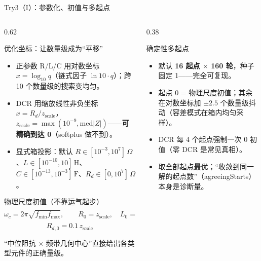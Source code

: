 \documentclass[UTF8,aspectratio=169,10pt]{ctexbeamer}
\begin{document}
\begin{frame}{Try3（I）：参数化、初值与多起点}
  \begin{columns}
    \begin{column}{0.62\textwidth}
      \begin{block}{优化坐标：让数量级成为“平移”}
        \begin{itemize}
          \item 正参数 R/L/C 用对数坐标 $x=\log_{10}q$（链式因子 $\ln 10\cdot q$）；跨 10 个数量级的搜索变均匀。
          \item DCR 用缩放线性非负坐标 $x=R_d/z_{\mathrm{scale}}$，$z_{\mathrm{scale}}=\max(10^{-9},\mathrm{med}|Z|)$——\textbf{可精确到达 0}（softplus 做不到）。
          \item 显式箱投影：默认 $R\in[10^{-3},10^{7}]\,\Omega$、$L\in[10^{-10},10]\,\mathrm{H}$、$C\in[10^{-13},10^{-3}]\,\mathrm{F}$、$R_d\in[0,10^{7}]\,\Omega$。
        \end{itemize}
      \end{block}
      \begin{block}{物理尺度初值（不靠运气起步）}
        {\small
        \[
          \omega_c=2\pi\sqrt{f_{\min}f_{\max}},\qquad
          R_0=z_{\mathrm{scale}},\quad L_0=\frac{z_{\mathrm{scale}}}{\omega_c},\quad
          C_0=\frac{1}{z_{\mathrm{scale}}\,\omega_c}
        \]
        \vspace{-2.2ex}
        \[
          R_{d,0}=0.1\,z_{\mathrm{scale}}
        \]}
        \vspace{-1ex}

        “中位阻抗 $\times$ 频带几何中心”直接给出各类型元件的正确量级。
      \end{block}
    \end{column}
    \begin{column}{0.38\textwidth}
      \begin{block}{确定性多起点}
        \begin{itemize}
          \item 默认 \textbf{16 起点 $\times$ 160 轮}，种子固定 1——完全可复现。
          \item 起点 0 = 物理尺度初值；其余在对数坐标加 $\pm 2.5$ 个数量级抖动（容差模式在箱内均匀采样）。
          \item DCR 每 4 个起点强制一次 0 初值（零 DCR 是常见真相）。
          \item 取全部起点最优；“收敛到同一解的起点数”（agreeingStarts）本身是诊断量。
        \end{itemize}
      \end{block}
    \end{column}
  \end{columns}
\end{frame}
\end{document}
